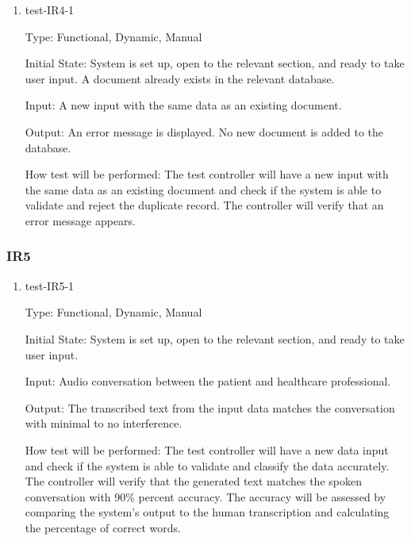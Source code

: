 \documentclass[12pt, titlepage]{article}
\begin{document}
  \begin{enumerate}

    \item{test-IR4-1} \label{test-IR4-1}
    
    Type: Functional, Dynamic, Manual
    
    Initial State: System is set up, open to the relevant section, and ready to take user input. A document already exists in the relevant database.

    Input: A new input with the same data as an existing document.
  
    Output: An error message is displayed. No new document is added to the database.  
    
    How test will be performed: The test controller will have a new input with the same data as an existing document and check if the system is able to validate and reject the duplicate record. The controller will verify that an error message appears.

  \end{enumerate}

  \subsubsection{IR5}
    
  \begin{enumerate}

    \item{test-IR5-1} \label{test-IR5-1}   
    
    Type: Functional, Dynamic, Manual
    
    Initial State: System is set up, open to the relevant section, and ready to take user input.

    Input: Audio conversation between the patient and healthcare professional.

    Output: The transcribed text from the input data matches the conversation with minimal to no interference.

    How test will be performed: The test controller will have a new data input and check if the system is able to validate and classify the data accurately. The controller will verify that the generated text matches the spoken conversation with 90\% percent accuracy. The accuracy will be assessed by comparing the system's output to the human transcription and calculating the percentage of correct words.

\end{enumerate}
\end{document}
